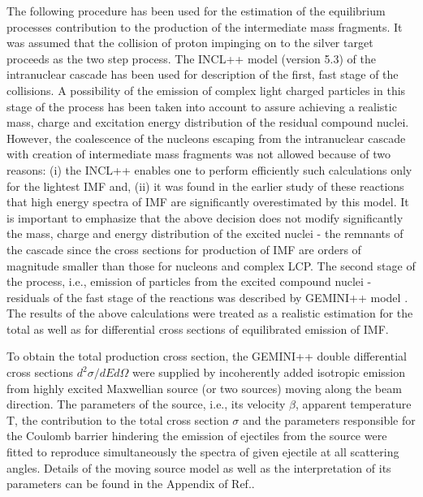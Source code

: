 The following procedure has been used for the estimation of the
equilibrium processes contribution to the production of the
intermediate mass fragments. It was assumed that the collision of
proton impinging on to the silver target proceeds as the two step
process. The INCL++ model (version 5.3) \cite{Mancusi2014} of the
intranuclear cascade has been used for description of the first,
fast stage of the collisions.
%
%
%
A possibility of the emission of complex light charged particles in
this stage of the process has been taken into account to assure
achieving a realistic mass, charge and excitation energy
distribution of the residual compound nuclei. However, the
coalescence of the nucleons escaping from the intranuclear cascade
with creation of intermediate mass fragments was not allowed because
of two reasons: (i) the INCL++ enables one to perform efficiently
such calculations only for the lightest IMF \cite{boudard2013new}  and,
(ii) it was found in the earlier study of these reactions
\cite{sharma2016ranking} that high energy spectra of IMF are significantly
overestimated by this model.  It is important to emphasize that the
above decision does not modify significantly the mass, charge and
energy distribution of the excited nuclei - the remnants of the
cascade since the cross sections for production of IMF are orders of
magnitude smaller than those for nucleons and complex LCP. The
second stage of the process, i.e., emission of particles from the
excited compound nuclei - residuals of the fast stage of the
reactions was described by GEMINI++ model \cite{GEMINI++}.  The
results of the above calculations were treated as a realistic
estimation for the total as well as for differential cross sections
of equilibrated emission of IMF.

To obtain the total production cross section, the GEMINI++ double
differential cross sections $d^2\sigma/dEd\Omega$ were supplied by
incoherently added isotropic emission from highly excited Maxwellian
source (or two sources) moving along the beam direction. The
parameters of the source, i.e., its velocity $\beta$, apparent
temperature T, the contribution to the total cross section $\sigma$
and the parameters responsible for the Coulomb barrier hindering the
emission of ejectiles from the source were fitted to reproduce
simultaneously the spectra of given ejectile at all scattering
angles. Details of the moving source model as well as the
interpretation of its parameters  can be found in the Appendix of
Ref.\cite{bubak2007non}.

